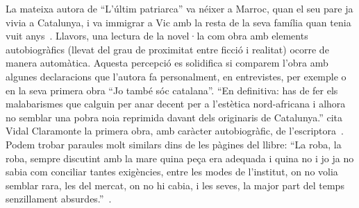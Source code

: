 La mateixa autora de ``L'últim patriarca'' va néixer a Marroc, quan el seu pare ja vivia a Catalunya, i va immigrar a Vic amb la resta de la seva família quan tenia vuit anys~\autocite{Vidal2012}.
Llavors, una lectura de la novel·la com obra amb elements autobiogràfics (llevat del grau de proximitat entre ficció i realitat) ocorre de manera automàtica.
Aquesta percepció es solidifica si comparem l'obra amb algunes declaracions que l'autora fa personalment, en entrevistes, per exemple o en la seva primera obra ``Jo també sóc catalana''.
``En definitiva: has de fer els malabarismes que calguin per anar decent per a l’estètica nord-africana i alhora no semblar una pobra noia reprimida davant dels originaris de Catalunya.'' cita Vidal Claramonte la primera obra, amb caràcter autobiogràfic, de l'escriptora~\autocite{Vidal2012}.
Podem trobar paraules molt similars dins de les pàgines del llibre:
``La roba, la roba, sempre discutint amb la mare quina peça era adequada i quina no i jo ja no sabia com conciliar tantes exigències, entre les modes de l'institut, on no volia semblar rara, les del mercat, on no hi cabia, i les seves, la major part del temps senzillament absurdes.''~\autocite[285]{ElHachmi2008}.


\begin{comment}

\subsection{Entrevistes: lectura autobiogràfica?}

[Vidal2012]

"Para ella, hay muchos tipos de discriminación: la del racista que golpea de frente, pero también la del paternalista, que dice cosas como que, aceptando al inmigrante, nuestra cultura se enriquece."
-- identitat cultural?

\end{comment}
